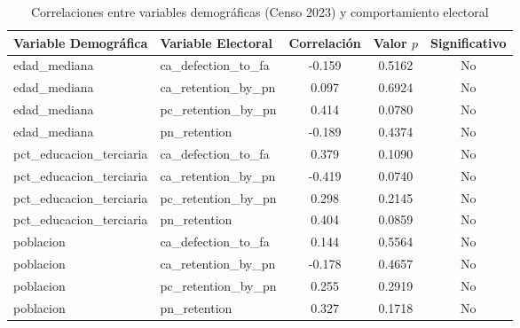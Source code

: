 \begin{table}
\caption{Correlaciones entre variables demográficas (Censo 2023) y comportamiento electoral}
\label{tab:census_correlations}
\begin{tabular}{llccc}
\toprule
Variable Demográfica & Variable Electoral & Correlación & Valor $p$ & Significativo \\
\midrule
edad_mediana & ca_defection_to_fa & -0.159 & 0.5162 & No \\
edad_mediana & ca_retention_by_pn & 0.097 & 0.6924 & No \\
edad_mediana & pc_retention_by_pn & 0.414 & 0.0780 & No \\
edad_mediana & pn_retention & -0.189 & 0.4374 & No \\
pct_educacion_terciaria & ca_defection_to_fa & 0.379 & 0.1090 & No \\
pct_educacion_terciaria & ca_retention_by_pn & -0.419 & 0.0740 & No \\
pct_educacion_terciaria & pc_retention_by_pn & 0.298 & 0.2145 & No \\
pct_educacion_terciaria & pn_retention & 0.404 & 0.0859 & No \\
poblacion & ca_defection_to_fa & 0.144 & 0.5564 & No \\
poblacion & ca_retention_by_pn & -0.178 & 0.4657 & No \\
poblacion & pc_retention_by_pn & 0.255 & 0.2919 & No \\
poblacion & pn_retention & 0.327 & 0.1718 & No \\
\bottomrule
\end{tabular}
\end{table}

